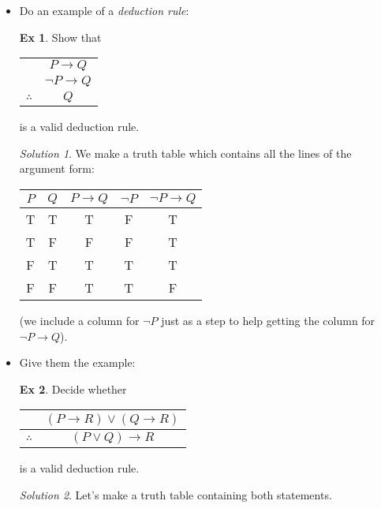 \documentclass[12pt]{article}
\theoremstyle{plain}
\theoremstyle{definition}
\newtheorem*{example}{Ex}
\theoremstyle{remark}
\newtheorem*{solution}{Solution}
\def\imp{\rightarrow}
\begin{document}
\begin{itemize}


\item Do an example of a \emph{deduction rule}:
\begin{example}
  Show that
  \begin{center}
    \begin{tabular}{rc}
      & $P \imp Q$\\
      & $\neg P \imp Q$ \\ \hline
      $\therefore$ & $Q$
    \end{tabular}
  \end{center}
  is a valid deduction rule.

  \begin{solution}
    We make a truth table which contains all the lines of the argument form:
    \begin{center}
      \begin{tabular}{c|c||c|c|c}
        $P$ & $Q$ & $P\imp Q$ & $\neg P$ & $\neg P \imp Q$ \\ \hline
        T & T & T & F & T \\
        T & F & F & F & T \\
        F & T & T & T & T \\
        F & F & T & T & F
      \end{tabular}
    \end{center}
    (we include a column for $\neg P$ just as a step to help getting the column for $\neg P \imp Q$).
  \end{solution}
\end{example}

\item Give them the example:
\begin{example}
  Decide whether
  \begin{center}
    \begin{tabular}{rc}
      &  $(P \imp R) \vee (Q \imp R)$ \\ \hline
      $\therefore$  & $(P \vee Q) \imp R$
    \end{tabular}
  \end{center}
  is a valid deduction rule.
  \begin{solution}
    Let's make a truth table containing both statements.


\end{solution}
\end{example}
\end{itemize}
\end{document}
